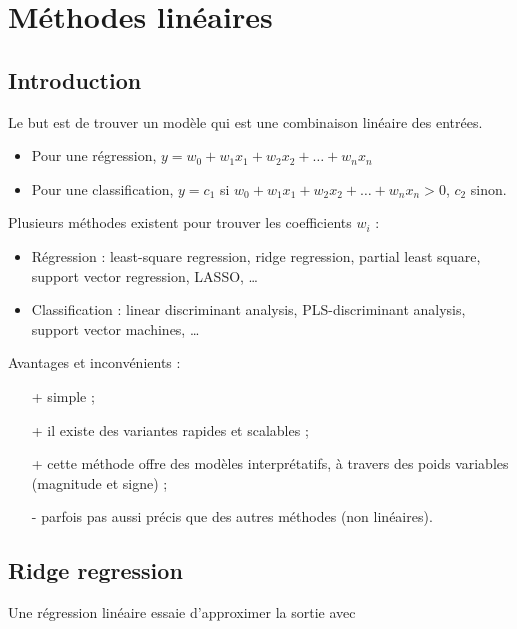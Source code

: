 \chapter{Méthodes linéaires}

	\section{Introduction}
	Le but est de trouver un modèle qui est une combinaison linéaire des entrées.

	\begin{itemize}
		\item Pour une régression, $y = w_0 + w_1 x_1 + w_2 x_2 + \dots + w_n x_n$
		\item Pour une classification, $y = c_1$ si $w_0 + w_1 x_1 + w_2 x_2 + \dots + w_n x_n > 0$, $c_2$ sinon.
	\end{itemize}


	Plusieurs méthodes existent pour trouver les coefficients $w_i$ : 

	\begin{itemize}
		\item Régression : least-square regression, ridge regression, partial least square, support vector regression, LASSO, \dots
		\item Classification : linear discriminant analysis, PLS-discriminant analysis, support vector machines, \dots \\
	\end{itemize} 

	Avantages et inconvénients :
	
	\begin{itemize}
		\item[+] simple ;
		\item[+] il existe des variantes rapides et scalables ;
		\item[+] cette méthode offre des modèles interprétatifs, à travers des poids variables (magnitude et signe) ;
		\item[-] parfois pas aussi précis que des autres méthodes (non linéaires).
	\end{itemize}

	\section{Ridge regression}
	
	Une régression linéaire essaie d'approximer la sortie avec
	

